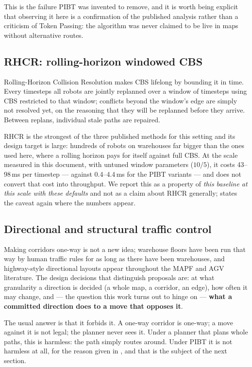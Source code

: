 This is the failure PIBT was invented to remove, and it is worth being explicit
that observing it here is a confirmation of the published analysis rather than
a criticism of Token Passing: the algorithm was never claimed to be live in
maps without alternative routes.

\subsection{RHCR: rolling-horizon windowed CBS}
\label{sec:related-rhcr}

Rolling-Horizon Collision Resolution \citep{li2021rhcr} makes CBS lifelong by
bounding it in time. Every  timesteps all robots are
jointly replanned over a window of  timesteps using CBS
restricted to that window; conflicts beyond the window's edge are simply not
resolved yet, on the reasoning that they will be replanned before they arrive.
Between replans, individual stale paths are repaired.

RHCR is the strongest of the three published methods for this setting and its
design target is large: hundreds of robots on warehouses far bigger than the
ones used here, where a rolling horizon pays for itself against full CBS. At
the scale measured in this document, with untuned window parameters
($10/5$), it costs 43--98\,ms per timestep --- against 0.4--4.4\,ms for the
PIBT variants --- and does not convert that cost into throughput. We report
this as a property of \emph{this baseline at this scale with these defaults}
and not as a claim about RHCR generally;  states the
caveat again where the numbers appear.

\subsection{Directional and structural traffic control}
\label{sec:related-directional}

Making corridors one-way is not a new idea; warehouse floors have been run that
way by human traffic rules for as long as there have been warehouses, and
highway-style directional layouts appear throughout the MAPF and AGV
literature. The design decisions that distinguish proposals are: at what
granularity a direction is decided (a whole map, a corridor, an edge), how
often it may change, and --- the question this work turns out to hinge on ---
\textbf{what a committed direction does to a move that opposes it}.

The usual answer is that it forbids it. A one-way corridor is one-way; a move
against it is not legal; the planner never sees it. Under a planner that plans
whole paths, this is harmless: the path simply routes around. Under PIBT it is
not harmless at all, for the reason given in , and that
is the subject of the next section.
